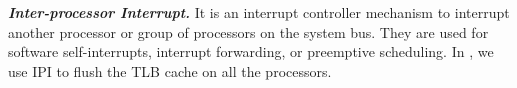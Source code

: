 \textbf{\textit{Inter-processor Interrupt.}}  It is an interrupt controller mechanism to interrupt another processor or group of processors on the system bus. They are used for software self-interrupts, interrupt forwarding, or preemptive scheduling. In \name, we use IPI to flush the TLB cache on all the processors.


%
%
%
